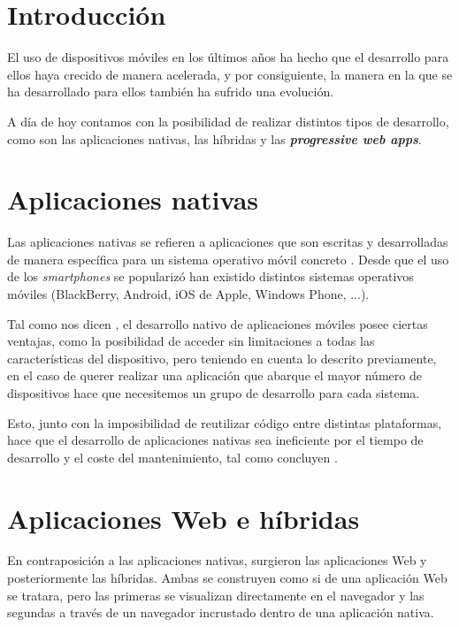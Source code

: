 \documentclass{\ClassPath/viu-tfm-template}
\begin{document}
    \graphicspath{{../../VIU_TFM_LaTeX_template/}}

    \coverpage

    \tableofcontents

\chapter{Introducción}

El uso de dispositivos móviles en los últimos años ha hecho que el desarrollo para ellos haya crecido de manera acelerada, y por consiguiente, la manera en la que se ha desarrollado para ellos también ha sufrido una evolución.

A día de hoy contamos con la posibilidad de realizar distintos tipos de desarrollo, como son las aplicaciones nativas, las híbridas y las \textbf{\textit{progressive web apps}}.

\chapter{Aplicaciones nativas}

Las aplicaciones nativas se refieren a aplicaciones que son escritas y desarrolladas de manera específica para un sistema operativo móvil concreto \parencite{Jobe_2013}. Desde que el uso de los \textit{smartphones} se popularizó han existido distintos sistemas operativos móviles (BlackBerry, Android, iOS de Apple, Windows Phone, ...).

Tal como nos dicen \textcite{thomas_2020}, el desarrollo nativo de aplicaciones móviles posee ciertas ventajas, como la posibilidad de acceder sin limitaciones a todas las características del dispositivo, pero teniendo en cuenta lo descrito previamente, en el caso de querer realizar una aplicación que abarque el mayor número de dispositivos hace que necesitemos un grupo de desarrollo para cada sistema.

Esto, junto con la imposibilidad de reutilizar código entre distintas plataformas, hace que el desarrollo de aplicaciones nativas sea ineficiente por el tiempo de desarrollo y el coste del mantenimiento, tal como concluyen \textcite{xanthopoulos2013comparative}.


\chapter{Aplicaciones Web e híbridas}

En contraposición a las aplicaciones nativas, surgieron las aplicaciones Web y posteriormente las híbridas. Ambas se construyen como si de una aplicación Web se tratara, pero las primeras se visualizan directamente en el navegador y las segundas a través de un navegador incrustado dentro de una aplicación nativa.
\end{document}
